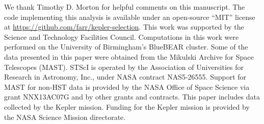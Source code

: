 \documentclass[apjl]{emulateapj}
\begin{document}
We thank Timothy D. Morton for helpful comments on this manuscript.
The code implementing this analysis is available under an open-source
``MIT'' license at \url{https://github.com/farr/kepler-selection}.
This work was supported by the Science and Technology Facilities
Council.  Computations in this work were performed on the University
of Birmingham's BlueBEAR cluster.  Some of the data presented in this
paper were obtained from the Mikulski Archive for Space Telescopes
(MAST). STScI is operated by the Association of Universities for
Research in Astronomy, Inc., under NASA contract NAS5-26555. Support
for MAST for non-HST data is provided by the NASA Office of Space
Science via grant NNX13AC07G and by other grants and contracts.  This
paper includes data collected by the Kepler mission. Funding for the
Kepler mission is provided by the NASA Science Mission directorate.



\end{document}
